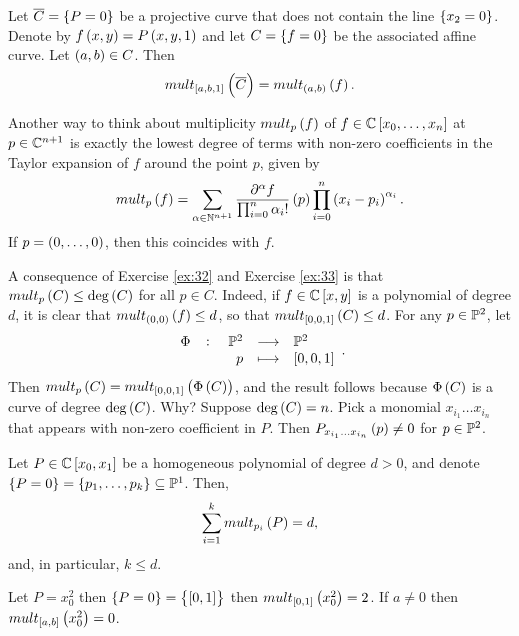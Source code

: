 \begin{exercise}
\label{ex:33}
Let $ \overline{C} = \cbr{P = 0} $ be a projective curve that does not contain the line $ \cbr{x_2 = 0} $. Denote by $ f\br{x, y} = P\br{x, y, 1} $ and let $ C = \cbr{f = 0} $ be the associated affine curve. Let $ \br{a, b} \in C $. Then
$$ mult_{\sbr{a, b, 1}}\br{\overline{C}} = mult_{\br{a, b}}\br{f}. $$
\end{exercise}

\begin{note*}
Another way to think about multiplicity $ mult_p\br{f} $ of $ f \in \C\sbr{x_0, \dots, x_n} $ at $ p \in \C^{n + 1} $ is exactly the lowest degree of terms with non-zero coefficients in the Taylor expansion of $ f $ around the point $ p $, given by
$$ mult_p\br{f} = \sum_{\alpha \in \N^{n + 1}} \dfrac{\partial^\alpha f}{\prod_{i = 0}^n \alpha_i!}\br{p}\prod_{i = 0}^n \br{x_i - p_i}^{\alpha_i}. $$
If $ p = \br{0, \dots, 0} $, then this coincides with $ f $.
\end{note*}

\begin{remark}
\label{rem:11.4}
A consequence of Exercise \ref{ex:32} and Exercise \ref{ex:33} is that $ mult_p\br{C} \le \deg\br{C} $ for all $ p \in C $. Indeed, if $ f \in \C\sbr{x, y} $ is a polynomial of degree $ d $, it is clear that $ mult_{\br{0, 0}}\br{f} \le d $, so that $ mult_{\sbr{0, 0, 1}}\br{C} \le d $. For any $ p \in \P^2 $, let
$$ \function[\Phi]{\P^2}{\P^2}{p}{\sbr{0, 0, 1}}. $$
Then $ mult_p\br{C} = mult_{\sbr{0, 0, 1}}\br{\Phi\br{C}} $, and the result follows because $ \Phi\br{C} $ is a curve of degree $ \deg\br{C} $. Why? Suppose $ \deg\br{C} = n $. Pick a monomial $ x_{i_1} \dots x_{i_n} $ that appears with non-zero coefficient in $ P $. Then $ P_{x_{i_1} \dots x_{i_n}}\br{p} \ne 0 $ for $ p \in \P^2 $.
\end{remark}

\begin{lemma}
\label{lem:11.5}
Let $ P \in \C\sbr{x_0, x_1} $ be a homogeneous polynomial of degree $ d > 0 $, and denote $ \cbr{P = 0} = \cbr{p_1, \dots, p_k} \subseteq \P^1 $. Then,
$$ \sum_{i = 1}^k mult_{p_i}\br{P} = d, $$
and, in particular, $ k \le d $.
\end{lemma}

\begin{example*}
Let $ P = x_0^2 $ then $ \cbr{P = 0} = \cbr{\sbr{0, 1}} $ then $ mult_{\sbr{0, 1}}\br{x_0^2} = 2 $. If $ a \ne 0 $ then $ mult_{\sbr{a, b}}\br{x_0^2} = 0 $.
\end{example*}

